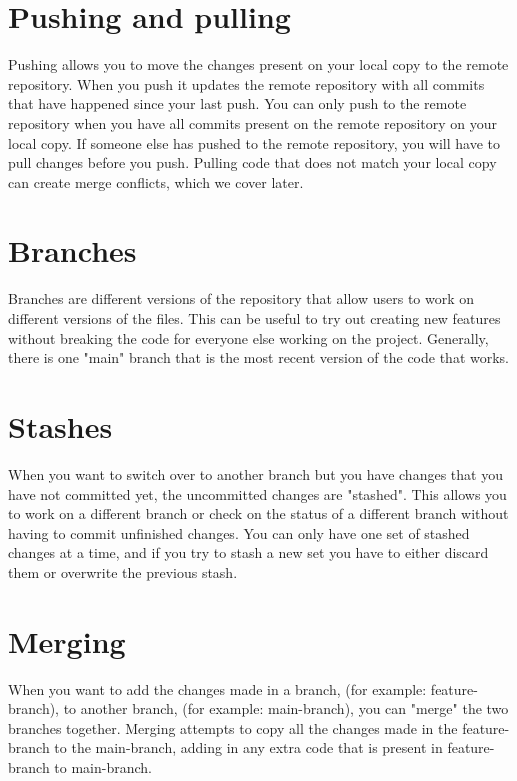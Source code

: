 \documentclass{article}
\begin{document}
\section{Pushing and pulling}

    Pushing allows you to move the changes present on your local copy to the remote repository. When you push it updates the remote repository with all commits that have happened since your last push. You can only push to the remote repository when you have all commits present on the remote repository on your local copy. If someone else has pushed to the remote repository, you will have to pull changes before you push. Pulling code that does not match your local copy can create merge conflicts, which we cover later.
    
\section{Branches}

    Branches are different versions of the repository that allow users to work on different versions of the files. This can be useful to try out creating new features without breaking the code for everyone else working on the project. Generally, there is one "main" branch that is the most recent version of the code that works. 

\section{Stashes}

    When you want to switch over to another branch but you have changes that you have not committed yet, the uncommitted changes are "stashed". This allows you to work on a different branch or check on the status of a different branch without having to commit unfinished changes. You can only have one set of stashed changes at a time, and if you try to stash a new set you have to either discard them or overwrite the previous stash.
    
\section{Merging}

    When you want to add the changes made in a branch, (for example: feature-branch), to another branch, (for example: main-branch), you can "merge" the two branches together. Merging attempts to copy all the changes made in the feature-branch to the main-branch, adding in any extra code that is present in feature-branch to main-branch.
\end{document}

